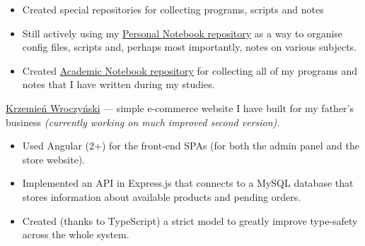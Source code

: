 \documentclass[10pt,a4paper,ragged2e,withhyper]{altacv}
\begin{document}
\begin{paracol}{2}



\divider


\divider


\divider




\begin{itemize}
\item Created special repositories for collecting programs, scripts and notes
\item Still actively using my \href{https://github.com/jerry-sky/personal-notebook#readme}{Personal Notebook repository} as a way to organise config files, scripts and, perhaps most importantly, notes on various subjects.
\item Created \href{https://github.com/jerry-sky/academic-notebook#readme}{Academic Notebook repository} for collecting all of my programs and notes that I have written during my studies.
\end{itemize}

\divider


\small\href{https://wroczynski.pl}{Krzemień Wroczyński} — simple e-commerce website I have built for my father’s business \textit{(currently working on much improved second version).}
\smallskip

\begin{itemize}
\item Used Angular (2+) for the front-end SPAs (for both the admin panel and the store website).
\item Implemented an API in Express.js that connects to a MySQL database that stores information about available products and pending orders.
\item Created (thanks to TypeScript) a strict model to greatly improve type-safety across the whole system.
\end{itemize}


\end{paracol}
\end{document}
